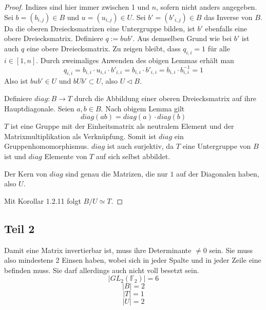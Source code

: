 \documentclass[10pt,a4paper]{article}
\begin{document}
\begin{proof}
  Indizes sind hier immer zwischen 1 und $n$, sofern nicht anders angegeben.
  Sei $b = (b_{i, j}) \in B$ und $u = (u_{i, j}) \in U$.
  Sei $b' = (b'_{i, j}) \in B$ das Inverse von $B$.
  Da die oberen Dreiecksmatrizen eine Untergruppe bilden, ist $b'$ ebenfalls eine obere Dreiecksmatrix.
  Definiere $q := bub'$.
  Aus demselben Grund wie bei $b'$ ist auch $q$ eine obere Dreiecksmatrix.
  Zu zeigen bleibt, dass $q_{i, i} = 1$ für alle $i \in [1, n]$.
  Durch zweimaliges Anwenden des obigen Lemmas erhält man
  \begin{equation}
    q_{i, i} = b_{i, i} \cdot u_{i, i} \cdot b'_{i, i} = b_{i, i} \cdot b'_{i, i} = b_{i, i} \cdot b_{i, i}^{-1} = 1
  \end{equation}
  Also ist $bub' \in U$ und $bUb' \subset U$, also $U \triangleleft B$.

  Definiere $diag : B \rightarrow T$ durch die Abbildung einer oberen Dreiecksmatrix auf ihre Hauptdiagonale.
  Seien $a, b \in B$.
  Nach obigem Lemma gilt
  \begin{equation}
    diag(ab) = diag(a) \cdot diag(b)
  \end{equation}
  $T$ ist eine Gruppe mit der Einheitsmatrix als neutralem Element und der Matrixmultiplikation als Verknüpfung.
  Somit ist $diag$ ein Gruppenhomomorphismus.
  $diag$ ist auch surjektiv, da $T$ eine Untergruppe von $B$ ist und $diag$ Elemente von $T$ auf sich selbst abbildet.

  Der Kern von $diag$ sind genau die Matrizen, die nur $1$ auf der Diagonalen haben, also $U$.

  Mit Korollar 1.2.11 folgt $B / U \simeq T$.
\end{proof}

\subsection{Teil 2}

Damit eine Matrix invertierbar ist, muss ihre Determinante $\ne 0$ sein.
Sie muss also mindestens 2 Einsen haben, wobei sich in jeder Spalte und in jeder Zeile eine befinden muss.
Sie darf allerdings auch nicht voll besetzt sein.
\begin{equation}
  |GL_{2}(\mathbb{F}_{2})| = 6
\end{equation}
\begin{equation}
  |B| = 2
\end{equation}
\begin{equation}
  |T| = 1
\end{equation}
\begin{equation}
  |U| = 2
\end{equation}
\end{document}
